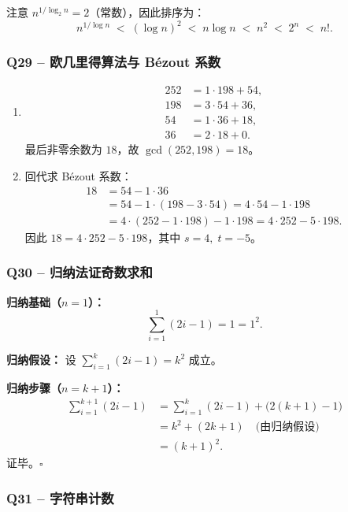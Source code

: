 \documentclass[11pt,a4paper,fontset=mac]{ctexart}
\begin{document}
注意 $n^{1/\log_2 n}=2$（常数），因此排序为：
\[
n^{1/\log n} \;<\; (\log n)^{2} \;<\; n\log n \;<\; n^{2} \;<\; 2^{n} \;<\; n!.
\]

\subsubsection*{Q29 \;--\; 欧几里得算法与 B\'{e}zout 系数}

\begin{enumerate}[label=(\alph*)]
  \item
  \[
  \begin{aligned}
  252 &= 1\cdot 198 + 54,\\
  198 &= 3\cdot 54 + 36,\\
  54  &= 1\cdot 36 + 18,\\
  36  &= 2\cdot 18 + 0.
  \end{aligned}
  \]
  最后非零余数为 $18$，故 $\gcd(252,198)=18$。

  \item 回代求 B\'{e}zout 系数：
  \[
  \begin{aligned}
  18 &= 54 - 1\cdot 36 \\
     &= 54 - 1\cdot(198 - 3\cdot 54) = 4\cdot 54 - 1\cdot 198 \\
     &= 4\cdot(252 - 1\cdot 198) - 1\cdot 198 = 4\cdot 252 - 5\cdot 198.
  \end{aligned}
  \]
  因此 $18 = 4\cdot 252 - 5\cdot 198$，其中 $s=4,\; t=-5$。
\end{enumerate}

\subsubsection*{Q30 \;--\; 归纳法证奇数求和}

\textbf{归纳基础（$n=1$）：}
\[
\sum_{i=1}^{1}(2i-1)=1=1^{2}.
\]

\textbf{归纳假设：} 设 $\displaystyle\sum_{i=1}^{k}(2i-1)=k^{2}$ 成立。

\textbf{归纳步骤（$n=k+1$）：}
\[
\begin{aligned}
\sum_{i=1}^{k+1}(2i-1)
&= \sum_{i=1}^{k}(2i-1) + \bigl(2(k+1)-1\bigr) \\
&= k^{2} + (2k+1) \quad\text{(由归纳假设)}\\
&= (k+1)^{2}.
\end{aligned}
\]
证毕。$\square$

\subsubsection*{Q31 \;--\; 字符串计数}
\end{document}
